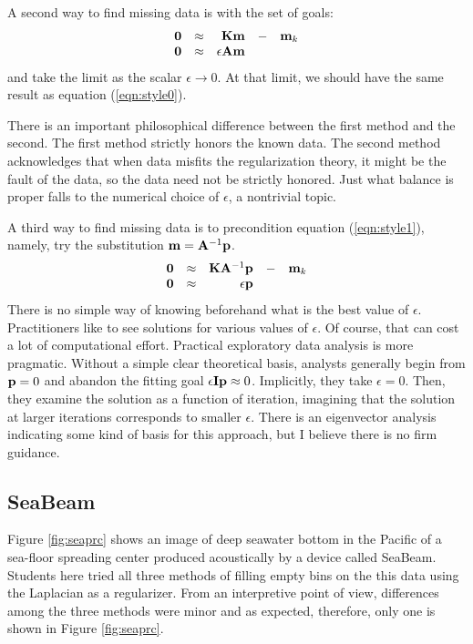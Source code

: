 \par
A second way to find missing data is with the set of goals:
\begin{equation}
\begin{array}{rrrrr}
\bold 0 & \approx &          \bold K \bold m  & - & \bold m_k \\
\bold 0 & \approx & \epsilon \bold A \bold m  &   &
\end{array}
\label{eqn:style1}
\end{equation}
and take the limit as the scalar $\epsilon \rightarrow 0$.
At that limit, we should have the same result
as equation (\ref{eqn:style0}).

\par
There is an important philosophical difference between
the first method and the second.
The first method strictly honors the known data.
The second method acknowledges that when data misfits
the regularization theory, it might be the fault of the data,
so the data need not be strictly honored.
Just what balance is proper falls to the numerical choice of $\epsilon$,
a nontrivial topic.

\par
A third way to find missing data is to precondition
equation (\ref{eqn:style1}),
namely, try the substitution 
$\bold m = \bold A^{-1} \bold p $.
\begin{equation}
\begin{array}{rrrrr}
\bold 0 & \approx & \bold K \bold A^{-1} \bold p  &-& \bold m_k \\
\bold 0 & \approx & \epsilon             \bold p  & &
\end{array}
\label{eqn:style2}
\end{equation}
There is no simple way of knowing beforehand
what is the best value of $\epsilon$.
Practitioners like to see solutions for various values of $\epsilon$.
Of course, that can cost a lot of computational effort.
Practical exploratory data analysis is more pragmatic.
Without a simple clear theoretical basis,
analysts generally begin from $\bold p=0$
and abandon the fitting goal $\epsilon \bold I \bold p\approx 0$.
Implicitly, they take $\epsilon=0$.
Then, they examine the solution as a function of iteration,
imagining that the solution at larger iterations
corresponds to smaller $\epsilon$.
There is an eigenvector analysis
indicating some kind of basis for this approach,
but I believe there is no firm guidance.

\subsection{SeaBeam}
Figure \ref{fig:seaprc} shows an image of deep seawater bottom
in the Pacific of a sea-floor spreading center produced acoustically
by a device called SeaBeam.
Students here tried all three methods of filling empty bins on the this data
using the Laplacian as a regularizer.
From an interpretive point of view,
differences among the three methods were minor and as expected,
therefore, only one is shown
in Figure \ref{fig:seaprc}.


